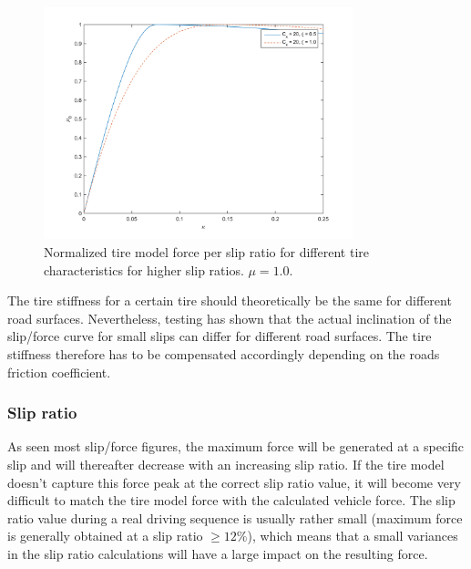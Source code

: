 \begin{figure}[h]
	\centering
	\includegraphics[width=0.8\textwidth]{Pictures/slipkraft_olika_xsi}
	\caption {Normalized tire model force per slip ratio for different tire characteristics for higher slip ratios.
		$ \mu = 1.0 $.}
	\label{different_xsi}
\end{figure}

The tire stiffness for a certain tire should theoretically be the same for different road surfaces. Nevertheless, testing has shown that the actual inclination of the slip/force curve for small slips can differ for different road surfaces. The tire stiffness therefore has to be compensated accordingly depending on the roads friction coefficient. 

\subsubsection{Slip ratio}
As seen most slip/force figures, the maximum force will be generated at a specific slip and will thereafter decrease with an increasing slip ratio. If the tire model doesn't capture this force peak at the correct slip ratio value, it will become very difficult to match the tire model force with the calculated vehicle force. The slip ratio value during a real driving sequence is usually rather small (maximum force is generally obtained at a slip ratio $ \geq 12 \% $), which means that a small variances in the slip ratio calculations will have a large impact on the resulting force.

